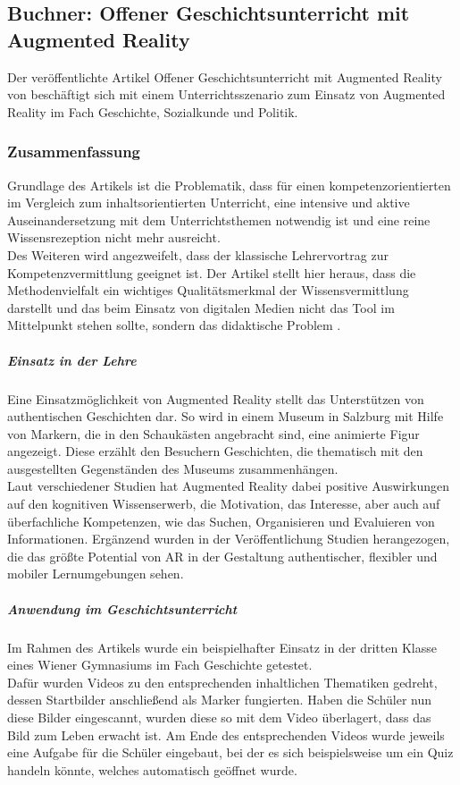 \subsection{Buchner: Offener Geschichtsunterricht mit Augmented Reality}
Der \citeyear{buchner:ar-geschichtsunterricht} veröffentlichte Artikel \glqq Offener Geschichtsunterricht mit Augmented Reality\grqq{} von \citeauthor{buchner:ar-geschichtsunterricht} beschäftigt sich mit einem Unterrichtsszenario zum Einsatz von Augmented Reality im Fach Geschichte, Sozialkunde und Politik. 


\subsubsection{Zusammenfassung}
Grundlage des Artikels ist die Problematik, dass für einen kompetenzorientierten im Vergleich zum inhaltsorientierten Unterricht, eine intensive und aktive Auseinandersetzung mit dem Unterrichtsthemen notwendig ist und eine reine Wissensrezeption nicht mehr ausreicht.\\ 
Des Weiteren wird angezweifelt, dass der klassische Lehrervortrag zur Kompetenzvermittlung geeignet ist. Der Artikel stellt hier heraus, dass die Methodenvielfalt ein wichtiges Qualitätsmerkmal der Wissensvermittlung darstellt und das beim Einsatz von digitalen Medien nicht das Tool im Mittelpunkt stehen sollte, sondern das didaktische Problem \citep[S. 7-8]{buchner:ar-geschichtsunterricht}.

\subparagraph{Einsatz in der Lehre}
Eine Einsatzmöglichkeit von Augmented Reality stellt das Unterstützen von authentischen Geschichten dar. So wird in einem Museum in Salzburg mit Hilfe von Markern, die in den Schaukästen angebracht sind, eine animierte Figur angezeigt. Diese erzählt den Besuchern Geschichten, die thematisch mit den ausgestellten Gegenständen des Museums zusammenhängen. \citep[Kapitel 3]{buchner:ar-geschichtsunterricht}\\
Laut verschiedener Studien hat Augmented Reality dabei positive Auswirkungen auf den kognitiven Wissenserwerb, die Motivation, das Interesse, aber auch auf überfachliche Kompetenzen, wie das Suchen, Organisieren und Evaluieren von Informationen. Ergänzend wurden in der Veröffentlichung Studien herangezogen, die das größte Potential von AR in der Gestaltung authentischer, flexibler und mobiler Lernumgebungen sehen. \citep[Kapitel 3]{buchner:ar-geschichtsunterricht}

\subparagraph{Anwendung im Geschichtsunterricht}
Im Rahmen des Artikels wurde ein beispielhafter Einsatz in der dritten Klasse eines Wiener Gymnasiums im Fach Geschichte getestet.\\
Dafür wurden Videos zu den entsprechenden inhaltlichen Thematiken gedreht, dessen Startbilder anschließend als Marker fungierten. Haben die Schüler nun diese Bilder eingescannt, wurden diese so mit dem Video überlagert, dass das Bild zum Leben erwacht ist. Am Ende des entsprechenden Videos wurde jeweils eine Aufgabe für die Schüler eingebaut, bei der es sich beispielsweise um ein Quiz handeln könnte, welches automatisch geöffnet wurde. \citep[Kapitel 4]{buchner:ar-geschichtsunterricht}


